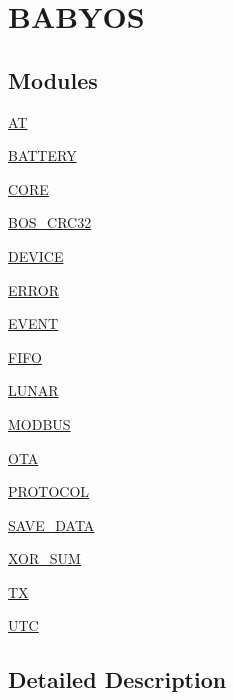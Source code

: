 \hypertarget{group___b_a_b_y_o_s}{}\section{B\+A\+B\+Y\+OS}
\label{group___b_a_b_y_o_s}
\subsection*{Modules}
\begin{DoxyCompactItemize}
\item 
\mbox{\hyperlink{group___a_t}{AT}}
\item 
\mbox{\hyperlink{group___b_a_t_t_e_r_y}{B\+A\+T\+T\+E\+RY}}
\item 
\mbox{\hyperlink{group___c_o_r_e}{C\+O\+RE}}
\item 
\mbox{\hyperlink{group___b_o_s___c_r_c32}{B\+O\+S\+\_\+\+C\+R\+C32}}
\item 
\mbox{\hyperlink{group___d_e_v_i_c_e}{D\+E\+V\+I\+CE}}
\item 
\mbox{\hyperlink{group___e_r_r_o_r}{E\+R\+R\+OR}}
\item 
\mbox{\hyperlink{group___e_v_e_n_t}{E\+V\+E\+NT}}
\item 
\mbox{\hyperlink{group___f_i_f_o}{F\+I\+FO}}
\item 
\mbox{\hyperlink{group___l_u_n_a_r}{L\+U\+N\+AR}}
\item 
\mbox{\hyperlink{group___m_o_d_b_u_s}{M\+O\+D\+B\+US}}
\item 
\mbox{\hyperlink{group___o_t_a}{O\+TA}}
\item 
\mbox{\hyperlink{group___p_r_o_t_o_c_o_l}{P\+R\+O\+T\+O\+C\+OL}}
\item 
\mbox{\hyperlink{group___s_a_v_e___d_a_t_a}{S\+A\+V\+E\+\_\+\+D\+A\+TA}}
\item 
\mbox{\hyperlink{group___x_o_r___s_u_m}{X\+O\+R\+\_\+\+S\+UM}}
\item 
\mbox{\hyperlink{group___t_x}{TX}}
\item 
\mbox{\hyperlink{group___u_t_c}{U\+TC}}
\end{DoxyCompactItemize}


\subsection{Detailed Description}
